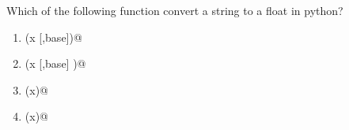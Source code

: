 \question
Which of the following function convert a string to a float in python?

\begin{enumerate}
\item \lstinline@int(x [,base])@
\item \lstinline@long(x [,base] )@
\item \lstinline@float(x)@
\item \lstinline@str(x)@
\end{enumerate}

